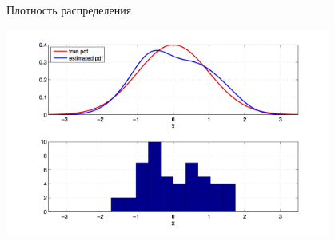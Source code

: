 \documentclass[9pt,pdf,utf8,hyperref={unicode},aspectratio=169]{beamer}
\begin{document}
\begin{frame}{Плотность распределения}
    \begin{center}
        \includegraphics[width=0.8\textwidth]{epdf.png}
    \end{center}
\end{frame}
\end{document}
